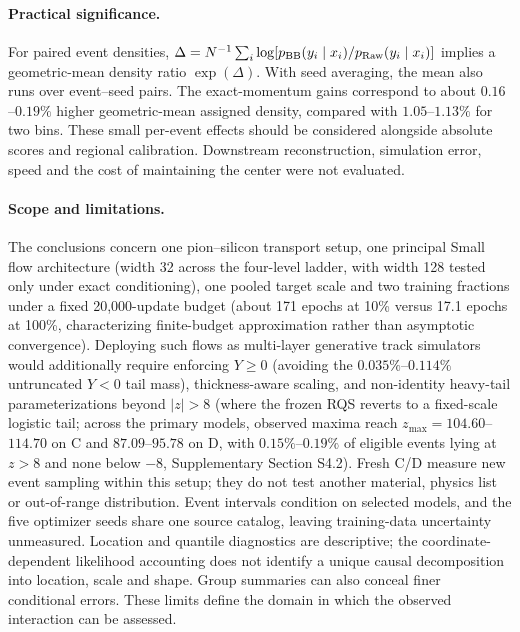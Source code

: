 \documentclass[twocolumn,epjc3]{svjour3}
\newcommand{\raw}{\mathrm{Raw}}
\begin{document}
\paragraph{Practical significance.}
For paired event densities,
$\Delta=N^{-1}\sum_i\log[p_{\rm BB}(y_i\mid x_i)/p_{\raw}(y_i\mid x_i)]$
implies a geometric-mean density ratio $\exp(\Delta)$. With seed averaging,
the mean also runs over event--seed pairs. The exact-momentum gains correspond
to about $0.16$--$0.19\%$ higher geometric-mean assigned density, compared
with $1.05$--$1.13\%$ for two bins. These small per-event effects should be
considered alongside absolute scores and regional calibration. Downstream
reconstruction, simulation error, speed and the cost of maintaining the
center were not evaluated.

\paragraph{Scope and limitations.}
The conclusions concern one pion--silicon transport setup, one principal
Small flow architecture (width 32 across the four-level ladder, with width 128
tested only under exact conditioning), one pooled target scale and two training
fractions under a fixed 20,000-update budget (about 171 epochs at 10\% versus
17.1 epochs at 100\%, characterizing finite-budget approximation rather than
asymptotic convergence). Deploying such flows as multi-layer generative track
simulators would additionally require enforcing $Y\geq0$ (avoiding the
$0.035\%$--$0.114\%$ untruncated $Y<0$ tail mass), thickness-aware scaling, and
non-identity heavy-tail parameterizations beyond $|z|>8$ (where the frozen RQS
reverts to a fixed-scale logistic tail; across the primary models, observed
maxima reach $z_{\max}=104.60$--$114.70$ on C and $87.09$--$95.78$ on D, with
$0.15\%$--$0.19\%$ of eligible events lying at $z>8$ and none below $-8$,
Supplementary Section S4.2).
Fresh C/D measure new event sampling within this setup; they do not test
another material, physics list or out-of-range distribution. Event intervals
condition on selected models, and the five optimizer seeds share one source
catalog, leaving training-data uncertainty unmeasured. Location and quantile
diagnostics are descriptive; the coordinate-dependent likelihood accounting
does not identify a unique causal decomposition into location, scale and
shape. Group summaries can also conceal finer conditional errors. These
limits define the domain in which the observed interaction can be assessed.
\end{document}
